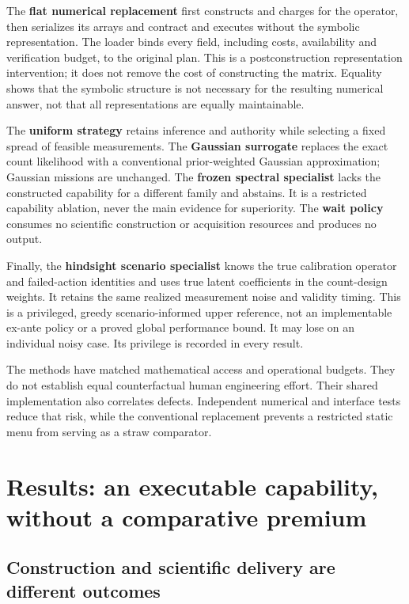\documentclass[11pt,letterpaper]{article}
\begin{document}
The \textbf{flat numerical replacement} first constructs and charges for the operator, then serializes its arrays and contract and executes without the symbolic representation. The loader binds every field, including costs, availability and verification budget, to the original plan. This is a postconstruction representation intervention; it does not remove the cost of constructing the matrix. Equality shows that the symbolic structure is not necessary for the resulting numerical answer, not that all representations are equally maintainable.

The \textbf{uniform strategy} retains inference and authority while selecting a fixed spread of feasible measurements. The \textbf{Gaussian surrogate} replaces the exact count likelihood with a conventional prior-weighted Gaussian approximation; Gaussian missions are unchanged. The \textbf{frozen spectral specialist} lacks the constructed capability for a different family and abstains. It is a restricted capability ablation, never the main evidence for superiority. The \textbf{wait policy} consumes no scientific construction or acquisition resources and produces no output.

Finally, the \textbf{hindsight scenario specialist} knows the true calibration operator and failed-action identities and uses true latent coefficients in the count-design weights. It retains the same realized measurement noise and validity timing. This is a privileged, greedy scenario-informed upper reference, not an implementable ex-ante policy or a proved global performance bound. It may lose on an individual noisy case. Its privilege is recorded in every result.

The methods have matched mathematical access and operational budgets. They do not establish equal counterfactual human engineering effort. Their shared implementation also correlates defects. Independent numerical and interface tests reduce that risk, while the conventional replacement prevents a restricted static menu from serving as a straw comparator.

\section{Results: an executable capability, without a comparative premium}\label{sec:results}

\subsection{Construction and scientific delivery are different outcomes}
\end{document}
